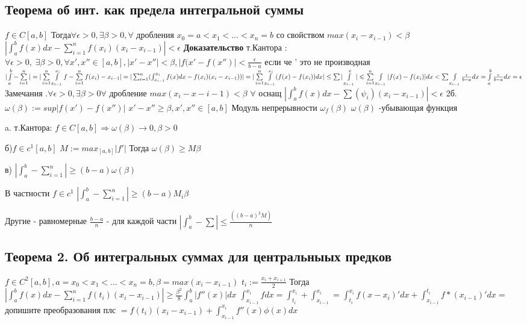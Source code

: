 \documentclass[12pt, a4paper]{article}
\newcommand{\nl}{\newline}
\begin{document}
	\subsection{Теорема об инт. как предела интегральной суммы}
	$ f \in C[a,b] $\nl
	Тогда$\forall \epsilon > 0 , \exists \beta>0, \forall$ дробления $ x_0 = a< x_1 < \dots < x_n =b $ со свойством $max(x_i -x_{i-1})< \beta$ \nl
	$| \int_a^b f(x) dx  - \sum_{i=1}^n f(x_i)(x_i -x_{i-1})|<\epsilon$ \nl
	\textbf{Доказательство} \nl
	т.Кантора : $  \forall \epsilon > 0, \; \exists \beta >0 , \forall x', x'' \in [a,b], | x' -x''| < \beta, |f(x' -f( x'')|<\frac{\epsilon}{b - a}$ если че '  это не производная \nl
	$|\int \limits_a^b - \sum \limits_{i=1}^n | = | \sum \limits_{i=1}^n \int \limits_{x_{i-1}}^{x_i} f - \sum \limits_{i=1}^n f(x_i)-x_{i-1}| = |\sum_{i=1}^n(\int_{x_{i-1}}^{x_i} f(x)dx - f(x_i)(x_i - x_{i-1})) |  \nl
	= |\sum \limits_{i=1}^n \int \limits_{x_{i-1}}^{x_i} (f(x)-f(x_i))dx|\leq \sum |\int \limits_{x_{i-1}}^x| \leqslant   \sum \limits_{i=1}^n \int \limits_{x_{i-1}}|f(x)-f(x_i)|dx < \sum \int \limits_{x_{i-1}}\frac{\epsilon}{b-a}dx = \int \limits_a^b \frac{\epsilon}{b-a} dx = \epsilon$ \nl
	Замечания \nl
	1.$\forall \epsilon > 0, \exists \beta > 0 \forall$ дробление $max(x_i - x-{i-1})<\beta$\nl
	$\forall$ оснащ \nl
	$|\int_a^b f(x)dx - \sum(\psi_i)(x_i - x_{i-1}) | < \epsilon$ \nl
	\nl
	2б. $\omega(\beta) := sup |f(x') - f(x'')| $\nl
	$x' -x'' \geqslant \beta, x',x'' \in [a, b]$ \nl
	Модуль непрерывности $ \omega_f(\beta) $ \nl
	$ \omega(\beta)$ -убывающая функция \nl
	
	a.  т.Кантора: \nl
	$ f \in C[a,b] \Rightarrow \omega(\beta) \longrightarrow 0, \beta >0 $ \nl
	
	б)$f\in c^1[a,b] $ \nl 
	$ M:= max_{[a,b]} |f'| $ \nl
	Тогда $ \omega(\beta) \geq M\beta $ \nl
	
	в) $|\int_a^b -\sum_{i=1}^n| \geq (b -a)\omega(\beta)$ \nl
	
	В частности  $f\in c^1$ \nl
	$ |\int_a^b -\sum_{i=1}^n| \geq (b-a)M_i\beta $ \nl
	
	Другие - равномерные $ \frac{b -a }{n} $ - для каждой части \nl
	$ |\int_a^b-\sum| \leq \frac{((b-a)^2M)}{n} $\nl
	
	\subsection{Теорема 2. Об интегральных суммах для центральныых предков}
	$ f \in C^2[a,b] , a = x_0 < x_1 < \dots < x_n = b ,  \beta = max(x_i - x_{i -1})$ \nl
	$t_{i} := \frac{x_{i}+x_{i+1}}{2} $ \nl 
	Тогда  $| \int_a^b f(x)dx- \sum_{i=1}^n f(t_i)(x_i - x_{i-1}) | \geq \frac{\beta^2}{8} \int_a^b |f''(x)|dx $ \nl
	$ \int_{x_{i-1}}^{x_i} f dx = \int_{t_i}^{x_i} + \int_{x_{i-1}}^{x_i} = \int_{t_i}^{x_i} f(x-x_i)' dx  + \int_{x_{i-1}}^{t_i} f*(x_{i-1})' dx =$ допишите преобразования плс $ =f(t_i)(x_i- x_{i-1}) + \int_{x_{i-1}}^{x_i}f''(x)\phi(x)dx $\nl
	
\end{document}
